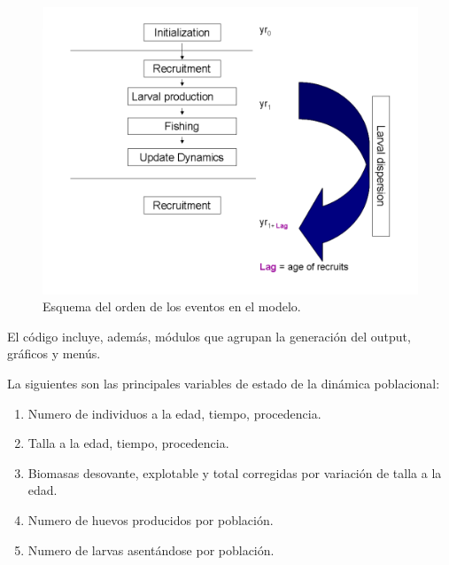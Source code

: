 			\begin{figure}[htb]
				\begin{center}
					\includegraphics[width=\textwidth]{MetapescaDinamics.png}
					\caption{Esquema del orden de los eventos en el modelo.}
					\label{fig:Esquema general}
				\end{center}
			\end{figure}	
		
		El código incluye, además, módulos que agrupan la generación del output, gráficos y menús. 

		La siguientes son las principales variables de estado de la dinámica poblacional:
		\begin{enumerate}
			\item Numero de individuos a la edad, tiempo, procedencia.
			\item Talla a la edad, tiempo, procedencia.
			\item Biomasas desovante, explotable y total corregidas por variación de talla a la edad.
			\item Numero de huevos producidos por población.
			\item Numero de larvas asentándose por población.
		\end{enumerate}
 
